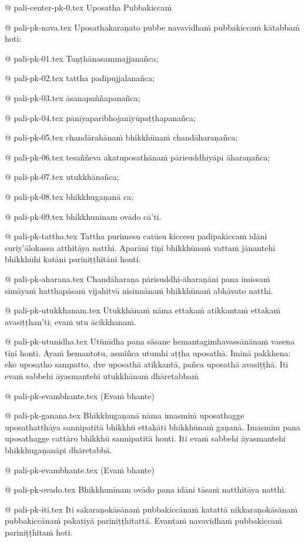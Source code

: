 @ pali-center-pk-0.tex
Uposatha Pubbakiccaṁ

@ pali-pk-nava.tex
Uposathakaraṇato pubbe navavidhaṁ pubbakiccaṁ kātabbaṁ hoti:

@ pali-pk-01.tex
Taṇṭhānasammajjanañca;

@ pali-pk-02.tex
tattha padīpujjalanañca;

@ pali-pk-03.tex
āsanapaññapanañca;

@ pali-pk-04.tex
pānīyaparibhojanīyūpaṭṭhapanañca;

@ pali-pk-05.tex
chandārahānaṁ bhikkhūnaṁ chandāharaṇañca;

@ pali-pk-06.tex
tesaññeva akatuposathānaṁ pārisuddhiyāpi āharaṇañca;

@ pali-pk-07.tex
utukkhānañca;

@ pali-pk-08.tex
bhikkhugaṇanā ca;

@ pali-pk-09.tex
bhikkhunīnam ovādo cā’ti.

@ pali-pk-tattha.tex
Tattha purimesu catūsu kiccesu padīpakiccaṁ idāni suriy’ālokassa atthitāya natthi. Aparāni tīṇi bhikkhūnaṁ vattaṁ jānantehi bhikkhūhi katāni pariniṭṭhitāni honti.

@ pali-pk-aharana.tex
Chandāharaṇa pārisuddhi-āharaṇāni pana imissaṁ sīmāyaṁ hatthapāsaṁ vijahitvā nisinnānaṁ bhikkhūnaṁ abhāvato natthi.

@ pali-pk-utukkhanam.tex
Utukkhānaṁ nāma ettakaṁ atikkantaṁ ettakaṁ avasiṭṭhan’ti; evaṁ utu ācikkhanaṁ. 

@ pali-pk-utunidha.tex
Utūnīdha pana sāsane hemantagimhavassānānaṁ vasena tīṇi honti. Ayaṁ hemantotu, asmiñca utumhi aṭṭha uposathā. Iminā pakkhena: eko uposatho sampatto, dve uposathā atikkantā, pañca uposathā avasiṭṭhā.  Iti evaṁ sabbehi āyasmantehi utukkhānaṁ dhāretabbaṁ

@ pali-pk-evambhante.tex
(Evaṁ bhante)

@ pali-pk-ganana.tex
Bhikkhugaṇanā nāma imasmiṁ uposathagge uposathatthāya sannipatitā bhikkhū ettakāti bhikkhūnaṁ gaṇanā. Imasmim pana uposathagge cattāro bhikkhū sannipatitā honti. Iti evaṁ sabbehi āyasmantehi bhikkhugaṇanāpi dhāretabbā.

@ pali-pk-evambhante.tex
(Evaṁ bhante)

@ pali-pk-ovado.tex
Bhikkhunīnam ovādo pana idāni tāsaṁ natthitāya natthi.

@ pali-pk-iti.tex
Iti sakaraṇokāsānaṁ pubbakiccānaṁ katattā nikkaraṇokāsānaṁ pubbakiccānaṁ pakatiyā pariniṭṭhitattā. Evantaṁ navavidhaṁ pubbakiccaṁ pariniṭṭhitaṁ hoti.


